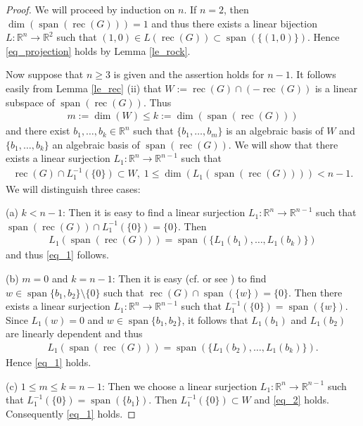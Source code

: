 \documentclass[10pt,a4paper]{amsart}
\theoremstyle{definition}
\newcommand{\R}{\mathbb{R}}
\newcommand{\rec}{\operatorname{rec}}
\newcommand{\spann}{\operatorname{span}}
\begin{document}
\begin{proof}
We will proceed by induction on $ n $. If $ n=2 $, then $ \dim(\spann(\rec(G)))=1 $ and thus there exists a linear bijection $ L:\R^n\to\R^2 $ such that $ (1,0)\in L(\rec(G))\subset\spann(\lbrace (1,0)\rbrace) $. Hence \eqref{eq_projection} holds by Lemma \ref{le_rock}.

Now suppose that $ n\geq 3 $ is given and the assertion holds for $ n-1 $. It follows easily from Lemma \ref{le_rec} (ii) that $ W:=\rec(G)\cap(-\rec(G)) $ is a linear subspace of $ \spann(\rec(G)) $. Thus
\begin{align*}
m:=\dim(W)\leq k:=\dim(\spann(\rec(G)))
\end{align*}
and there exist $ b_1,\dots,b_k\in\R^n $ such that $ \lbrace b_1,\dots,b_m\rbrace $ is an algebraic basis of $ W $ and $ \lbrace b_1,\dots,b_k\rbrace $ an algebraic basis of $ \spann(\rec(G)) $. We will show that there exists a linear surjection $ L_1:\R^n\to\R^{n-1} $ such that
\begin{align}\label{eq_1}
\rec(G)\cap L_1^{-1}(\lbrace 0\rbrace)\subset W,\;1\leq\dim(L_1(\spann(\rec(G))))<n-1.
\end{align}
We will distinguish three cases:

(a) $ k<n-1 $: Then it is easy to find a linear surjection $ L_1:\R^n\to\R^{n-1} $ such that $ \spann(\rec(G))\cap L_1^{-1}(\lbrace 0\rbrace)=\lbrace 0\rbrace $. Then
\begin{align*}
L_1(\spann(\rec(G)))=\spann(\lbrace L_1(b_1),\dots,L_1(b_k)\rbrace)
\end{align*}
and thus \eqref{eq_1} follows.

(b) $ m=0 $ and $ k=n-1 $: Then it is easy (cf. \cite[Lemma 5.10]{KZ} or see \cite[Consequence 2]{S}) to find $ w\in\spann\lbrace b_1,b_2\rbrace\setminus\lbrace 0\rbrace $ such that $ \rec(G) \cap\spann(\lbrace w\rbrace)=\lbrace 0\rbrace $. Then there exists a linear surjection $ L_1:\R^n\to\R^{n-1} $ such that $ L_1^{-1}(\lbrace 0\rbrace)=\spann(\lbrace w\rbrace) $. Since $ L_1(w)=0 $ and $ w\in\spann\lbrace b_1,b_2\rbrace $, it follows that $ L_1(b_1) $ and $ L_1(b_2) $ are linearly dependent and thus  
\begin{align}\label{eq_2}
L_1(\spann(\rec(G)))=\spann(\lbrace L_1(b_2),\dots,L_1(b_k)\rbrace).
\end{align}
Hence \eqref{eq_1} holds. 

(c) $ 1\leq m\leq k=n-1 $: Then we choose a linear surjection $ L_1:\R^n\to\R^{n-1} $ such that $ L_1^{-1}(\lbrace 0\rbrace)=\spann(\lbrace b_1\rbrace) $. Then $ L_1^{-1}(\lbrace 0\rbrace)\subset W $ and \eqref{eq_2} holds. Consequently \eqref{eq_1} holds.


\end{proof}
\end{document}
